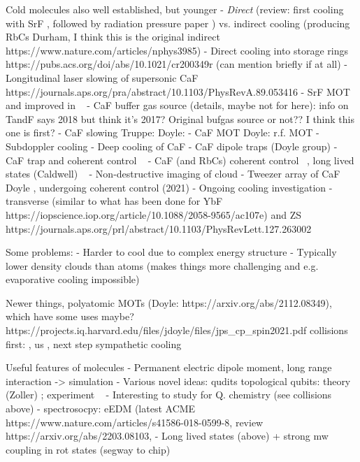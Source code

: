 Cold molecules also well established, but younger
- \emph{Direct} (review: \cite{Tarbutt2018} first cooling with SrF \cite{Shuman2009}, followed by
radiation pressure paper \cite{PhysRevLett.108.103002}) vs. indirect cooling
(producing RbCs Durham, I think this is the original indirect
https://www.nature.com/articles/nphys3985)
- Direct cooling into storage rings https://pubs.acs.org/doi/abs/10.1021/cr200349r
(can mention briefly if at all) \cite{PhysRevA.89.033604}
- Longitudinal laser slowing of supersonic CaF https://journals.aps.org/pra/abstract/10.1103/PhysRevA.89.053416
- SrF MOT \cite{Barry2014} and improved in ~\cite{PhysRevLett.116.063004}
- CaF buffer gas source (details, maybe not for here): \cite{Truppe2018} %
info on TandF says 2018 but think it's 2017? Original bufgas source
\cite{Barry2011} or not?? I think this one is first? \cite{Maxwell2005}
- CaF slowing Truppe: \cite{Truppe2017a} Doyle: \cite{0953-4075-49-17-174001}
- CaF MOT Doyle: r.f. MOT \cite{PhysRevLett.119.103201}
- Subdoppler cooling \cite{Truppe2017}
- Deep cooling of CaF \cite{PhysRevLett.123.033202}
- CaF dipole traps (Doyle group)
- CaF trap and coherent control ~\cite{WilliamsMagnetic2018}
- CaF (and RbCs) coherent control ~\cite{Blackmore_2018}, long lived states
(Caldwell) ~\cite{PhysRevLett.124.063001}
- Non-destructive imaging of cloud \cite{PhysRevLett.121.083201}
- Tweezer array of CaF Doyle \cite{Anderegg2019}, undergoing coherent control
\cite{PhysRevLett.127.123202} (2021)
- Ongoing cooling investigation - transverse (similar to what has been done for
YbF https://iopscience.iop.org/article/10.1088/2058-9565/ac107e) and ZS https://journals.aps.org/prl/abstract/10.1103/PhysRevLett.127.263002

Some problems:
- Harder to cool due to complex energy structure
- Typically lower density clouds than atoms (makes things more challenging and
e.g. evaporative cooling impossible)

Newer things, polyatomic MOTs (Doyle: https://arxiv.org/abs/2112.08349),
which have some uses maybe? https://projects.iq.harvard.edu/files/jdoyle/files/jps_cp_spin2021.pdf
collisions first: \cite{son2019collisional}, us \cite{Jurgilas2021, JurgilasPRL_2021}, next step sympathetic cooling

Useful features of molecules
- Permanent electric dipole moment, long range interaction -> simulation
- Various novel ideas:
   qudits \cite{Sawant_2020}
   topological qubits: theory (Zoller) \cite{Micheli2006};  experiment ~\cite{Gross995}
- Interesting to study for Q. chemistry (see collisions above)
- spectrosocpy: eEDM
(latest ACME https://www.nature.com/articles/s41586-018-0599-8,
review https://arxiv.org/abs/2203.08103, 
- Long lived states (above) + strong mw coupling in rot states (segway to chip)

